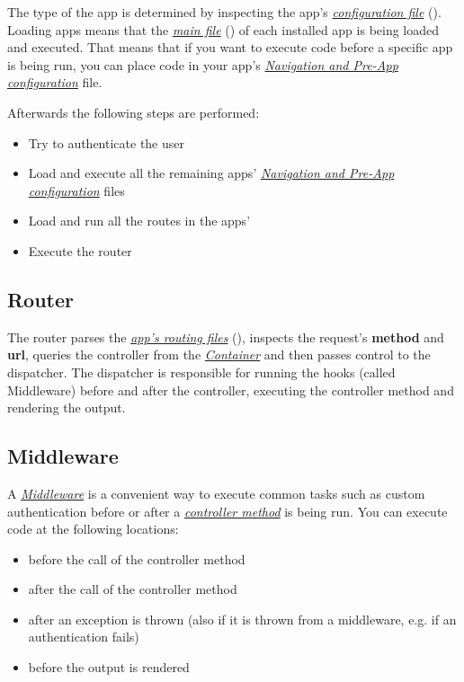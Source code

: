 \documentclass[letterpaper,10pt,english]{sphinxmanual}
\begin{document}
The type of the app is determined by inspecting the app's {\hyperref[app/info::doc]{\emph{\emph{configuration file}}}} (). Loading apps means that the {\hyperref[app/init::doc]{\emph{\emph{main file}}}} () of each installed app is being loaded and executed. That means that if you want to execute code before a specific app is being run, you can place code in your app's {\hyperref[app/init::doc]{\emph{\emph{Navigation and Pre-App configuration}}}} file.

Afterwards the following steps are performed:
\begin{itemize}
\item {} 
Try to authenticate the user

\item {} 
Load and execute all the remaining apps' {\hyperref[app/init::doc]{\emph{\emph{Navigation and Pre-App configuration}}}} files

\item {} 
Load and run all the routes in the apps' 

\item {} 
Execute the router

\end{itemize}


\subsection{Router}
\label{app/request:router}
The router parses the {\hyperref[app/routes::doc]{\emph{\emph{app's routing files}}}} (), inspects the request's \textbf{method} and \textbf{url}, queries the controller from the {\hyperref[app/container::doc]{\emph{\emph{Container}}}} and then passes control to the dispatcher. The dispatcher is responsible for running the hooks (called Middleware) before and after the controller, executing the controller method and rendering the output.


\subsection{Middleware}
\label{app/request:middleware}
A {\hyperref[app/middleware::doc]{\emph{\emph{Middleware}}}} is a convenient way to execute common tasks such as custom authentication before or after a {\hyperref[app/controllers::doc]{\emph{\emph{controller method}}}} is being run. You can execute code at the following locations:
\begin{itemize}
\item {} 
before the call of the controller method

\item {} 
after the call of the controller method

\item {} 
after an exception is thrown (also if it is thrown from a middleware, e.g. if an authentication fails)

\item {} 
before the output is rendered

\end{itemize}
\end{document}
